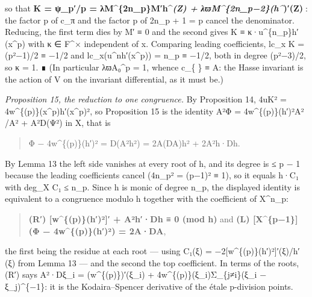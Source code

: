 \documentclass[11pt,a4paper]{article}
\theoremstyle{named}
\begin{document}
so that \textbf{K = ψ\_p′/p = λM\textasciicircum{}\{2n\_p\}M′h\textasciicircum{}\textit{(Z) + λϖM\textasciicircum{}\{2n\_p−2\}(h\textasciicircum{}})′(Z)}: the factor p of c\_π and the factor p of 2n\_p + 1 = p cancel the denominator. Reducing, the first term dies by M′ ≡ 0 and the second gives K ≡ κ·u\textasciicircum{}\{n\_p\}h′(x\textasciicircum{}p) with κ ∈ F\textasciicircum{}× independent of x. Comparing leading coefficients, lc\_x K = (p²−1)/2 ≡ −1/2 and lc\_x(u\textasciicircum{}nh′(x\textasciicircum{}p)) = n\_p ≡ −1/2, both in degree (p²−3)/2, so κ = 1. ∎ (In particular λϖA₀\textasciicircum{}p = 1, whence c\_\{\} ≡ A: the Hasse invariant is the action of V on the invariant differential, as it must be.)

\textit{Proposition 15, the reduction to one congruence.} By Proposition 14, 4uK² = 4w\textasciicircum{}\{(p)\}(x\textasciicircum{}p)h′(x\textasciicircum{}p)², so Proposition 15 is the identity A²Φ = 4w\textasciicircum{}\{(p)\}(h′)²A² /A² + A²D(Ψ²) in X, that is

\begin{quote}
Φ − 4w\textasciicircum{}\{(p)\}(h′)² = D(A²h²) = 2A(DA)h² + 2A²h·Dh.
\end{quote}

By Lemma 13 the left side vanishes at every root of h, and its degree is ≤ p − 1 because the leading coefficients cancel (4n\_p² = (p−1)² ≡ 1), so it equals h·C₁ with deg\_X C₁ ≤ n\_p. Since h is monic of degree n\_p, the displayed identity is equivalent to a congruence modulo h together with the coefficient of X\textasciicircum{}n\_p:

\begin{quote}
\textbf{(R′) [w\textasciicircum{}\{(p)\}(h′)²]′ + A²h′·Dh ≡ 0 (mod h)}  and  \textbf{(L) [X\textasciicircum{}\{p−1\}](Φ − 4w\textasciicircum{}\{(p)\}(h′)²) = 2A·DA},
\end{quote}

the first being the residue at each root — using C₁(ξ) = −2[w\textasciicircum{}\{(p)\}(h′)²]′(ξ)/h′(ξ) from Lemma 13 — and the second the top coefficient. In terms of the roots, (R′) says A²·Dξ\_i = (w\textasciicircum{}\{(p)\})′(ξ\_i) + 4w\textasciicircum{}\{(p)\}(ξ\_i)Σ\_\{j≠i\}(ξ\_i − ξ\_j)\textasciicircum{}\{−1\}: it is the Kodaira–Spencer derivative of the étale p-division points.
\end{document}
